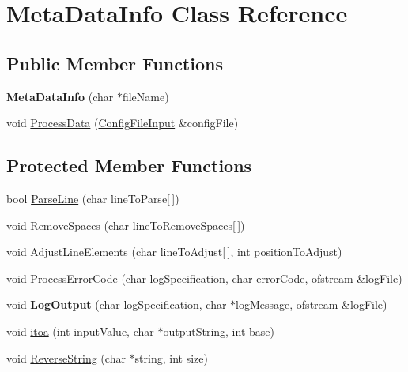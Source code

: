 \hypertarget{class_meta_data_info}{\section{Meta\-Data\-Info Class Reference}
\label{class_meta_data_info}
}
\subsection*{Public Member Functions}
\begin{DoxyCompactItemize}
\item 
\hypertarget{class_meta_data_info_af98d5c5b43cd3bcd86438554ea91751e}{{\bfseries Meta\-Data\-Info} (char $\ast$file\-Name)}\label{class_meta_data_info_af98d5c5b43cd3bcd86438554ea91751e}

\item 
void \hyperlink{class_meta_data_info_a22aac63a00cbf47e5cdbc8bc10cf3ac8}{Process\-Data} (\hyperlink{class_config_file_input}{Config\-File\-Input} \&config\-File)
\end{DoxyCompactItemize}
\subsection*{Protected Member Functions}
\begin{DoxyCompactItemize}
\item 
bool \hyperlink{class_meta_data_info_a56a4ddcd4429a6324c7715e8deb199f1}{Parse\-Line} (char line\-To\-Parse\mbox{[}$\,$\mbox{]})
\item 
void \hyperlink{class_meta_data_info_a525056e90a718a3f42147b0ec8c9456a}{Remove\-Spaces} (char line\-To\-Remove\-Spaces\mbox{[}$\,$\mbox{]})
\item 
void \hyperlink{class_meta_data_info_ad22e892de632d1d0800099e7daf7c941}{Adjust\-Line\-Elements} (char line\-To\-Adjust\mbox{[}$\,$\mbox{]}, int position\-To\-Adjust)
\item 
void \hyperlink{class_meta_data_info_a5bc8f03132a3a575433517cc1de3295d}{Process\-Error\-Code} (char log\-Specification, char error\-Code, ofstream \&log\-File)
\item 
\hypertarget{class_meta_data_info_a6150ce3a4dd26ea2326eb838ef9fef6f}{void {\bfseries Log\-Output} (char log\-Specification, char $\ast$log\-Message, ofstream \&log\-File)}\label{class_meta_data_info_a6150ce3a4dd26ea2326eb838ef9fef6f}

\item 
void \hyperlink{class_meta_data_info_a860a5bbc2b79a2c8fe5fa83bae3bb7f1}{itoa} (int input\-Value, char $\ast$output\-String, int base)
\item 
void \hyperlink{class_meta_data_info_a03d279a6dc693da0099cf016541b34eb}{Reverse\-String} (char $\ast$string, int size)
\end{DoxyCompactItemize}


